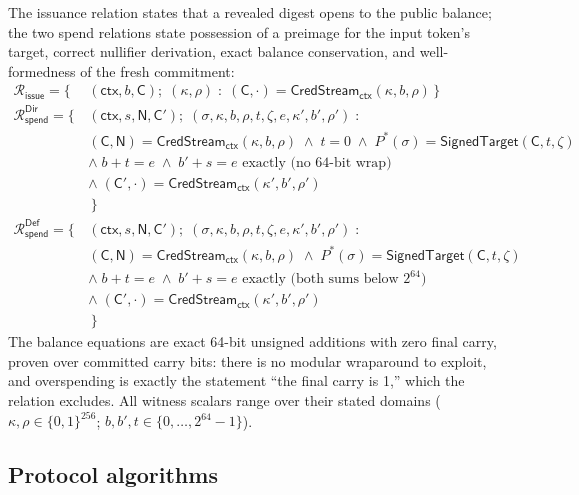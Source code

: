\documentclass[11pt]{article}
\newcommand{\ctx}{\mathsf{ctx}}
\newcommand{\Cred}{\mathsf{C}}
\newcommand{\Null}{\mathsf{N}}
\begin{document}
The issuance relation states that a revealed digest opens to the public
balance; the two spend relations state possession of a preimage for the
input token's target, correct nullifier derivation, exact balance
conservation, and well-formedness of the fresh commitment:
\begin{align*}
\mathcal{R}_{\mathsf{issue}} = \bigl\{\,
 &(\ctx, b, \Cred);\; (\kappa, \rho) \;:\;
 (\Cred, \cdot) = \mathsf{CredStream}_{\ctx}(\kappa, b, \rho)
 \,\bigr\} \\[0.4em]
\mathcal{R}_{\mathsf{spend}}^{\mathsf{Dir}} = \bigl\{\,
 &(\ctx, s, \Null, \Cred');\;
   (\sigma, \kappa, b, \rho, t,\zeta,e, \kappa', b', \rho') \;: \\
 &(\Cred, \Null) = \mathsf{CredStream}_{\ctx}(\kappa, b, \rho)
 \;\wedge\; t=0
 \;\wedge\; P^\ast(\sigma) = \mathsf{SignedTarget}(\Cred,t,\zeta) \\
 &\wedge\; b+t=e \;\wedge\; b' + s = e
   \text{ exactly (no 64-bit wrap)} \\
 &\wedge\; (\Cred', \cdot) =
   \mathsf{CredStream}_{\ctx}(\kappa', b', \rho')
 \\[-0.2em]
 &\,\bigr\} \\[0.4em]
\mathcal{R}_{\mathsf{spend}}^{\mathsf{Def}} = \bigl\{\,
 &(\ctx, s, \Null, \Cred');\;
   (\sigma, \kappa, b, \rho, t,\zeta,e, \kappa', b', \rho') \;: \\
 &(\Cred, \Null) = \mathsf{CredStream}_{\ctx}(\kappa, b, \rho)
 \;\wedge\; P^\ast(\sigma) = \mathsf{SignedTarget}(\Cred,t,\zeta) \\
 &\wedge\; b+t=e \;\wedge\; b' + s=e
   \text{ exactly (both sums below } 2^{64}) \\
 &\wedge\; (\Cred', \cdot) =
   \mathsf{CredStream}_{\ctx}(\kappa', b', \rho')
 \\[-0.2em]
 &\,\bigr\}
\end{align*}
The balance equations are exact 64-bit unsigned additions with zero final
carry, proven over committed carry bits: there is no modular wraparound to
exploit, and overspending is exactly the statement ``the final carry is
1,'' which the relation excludes. All witness scalars range over their
stated domains ($\kappa, \rho \in \{0,1\}^{256}$;
$b, b', t \in \{0, \dots, 2^{64}{-}1\}$).

\subsection{Protocol algorithms}
\label{sec:algorithms}
\end{document}
